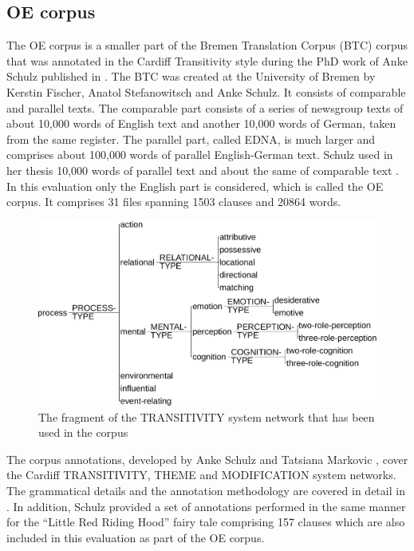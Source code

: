 \subsection{OE corpus}

    The OE corpus is a smaller part of the Bremen Translation Corpus (BTC) corpus that was annotated in the Cardiff Transitivity style during the PhD work of Anke Schulz published in \citeyear{schulz2015me}. The BTC was created at the University of Bremen by Kerstin Fischer, Anatol Stefanowitsch and Anke Schulz. It consists of comparable and parallel texts. The comparable part consists of a series of newsgroup texts of about 10,000 words of English text and another 10,000 words of German, taken from the same register. The parallel part, called EDNA, is much larger and comprises about 100,000 words of parallel English-German text. Schulz used in her thesis 10,000 words of parallel text and about the same of comparable text \citep[31]{schulz2015me}. In this evaluation only the English part is considered, which is called the OE corpus. It comprises 31 files spanning 1503 clauses and 20864 words. 
    
    \begin{figure}[!h]
        \centering
        \includegraphics[width=.75\textwidth]{Figures/Evaluation/trans-simplified.pdf}
        \caption{The fragment of the TRANSITIVITY system network that has been used in the corpus}
        \label{fig:transitivity-simplified}
    \end{figure}

    The corpus annotations, developed by Anke Schulz and Tatsiana Markovic \citep[36]{schulz2015me}, cover the Cardiff TRANSITIVITY, THEME and MODIFICATION system networks. The grammatical details and the annotation methodology are covered in detail in \citet[48-161]{schulz2015me}. In addition, Schulz provided a set of annotations performed in the same manner for the ``Little Red Riding Hood'' fairy tale comprising 157 clauses which are also included in this evaluation as part of the OE corpus.
    
